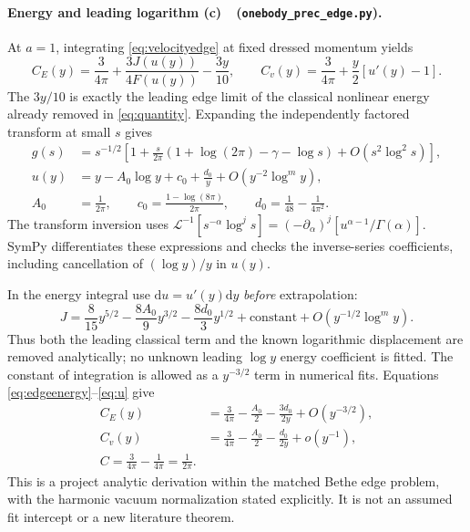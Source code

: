\documentclass[11pt,a4paper]{article}
\newcommand{\Lc}{\textbf{(c)}\ }
\newcommand{\dd}{\mathrm d}
\newcommand{\edge}{\texttt{onebody\_\allowbreak prec\_\allowbreak edge.py}}
\begin{document}
\paragraph{Energy and leading logarithm \Lc\ (\edge).}
At $a=1$, integrating \eqref{eq:velocityedge} at fixed dressed momentum yields
\begin{equation}
 C_E(y)=\frac3{4\pi}+\frac{3J(u(y))}{4F(u(y))}-\frac{3y}{10},\qquad
 C_v(y)=\frac3{4\pi}+\frac y2[u'(y)-1].
 \label{eq:edgeenergy}
\end{equation}
The $3y/10$ is exactly the leading edge limit of the classical nonlinear
energy already removed in \eqref{eq:quantity}.
Expanding the independently factored transform at small $s$ gives
\begin{align}
 g(s)&=s^{-1/2}\left[1+\frac{s}{2\pi}
 (1+\log(2\pi)-\gamma-\log s)+O(s^2\log^2s)\right],\\
 u(y)&=y-A_0\log y+c_0+\frac{d_0}{y}+O(y^{-2}\log^m y),\label{eq:u}\\
 A_0&=\frac1{2\pi},\qquad
 c_0=\frac{1-\log(8\pi)}{2\pi},\qquad
 d_0=\frac1{48}-\frac1{4\pi^2}.
\end{align}
The transform inversion uses
$\mathcal L^{-1}[s^{-\alpha}\log^j s]
=(-\partial_\alpha)^j[u^{\alpha-1}/\Gamma(\alpha)]$.
SymPy differentiates these expressions and checks the inverse-series
coefficients, including cancellation of $(\log y)/y$ in $u(y)$.

In the energy integral use $\dd u=u'(y)\dd y$ \emph{before} extrapolation:
\begin{equation}
 J=\frac8{15}y^{5/2}-\frac{8A_0}{9}y^{3/2}
       -\frac{8d_0}{3}y^{1/2}+\text{constant}+O(y^{-1/2}\log^m y).
\end{equation}
Thus both the leading classical term and the known logarithmic displacement
are removed analytically; no unknown leading $\log y$ energy coefficient is fitted.
The constant of integration is allowed as a $y^{-3/2}$ term in numerical fits.
Equations \eqref{eq:edgeenergy}--\eqref{eq:u} give
\begin{align}
 C_E(y)&=\frac3{4\pi}-\frac{A_0}{2}-\frac{3d_0}{2y}
                  +O(y^{-3/2}),\\
 C_v(y)&=\frac3{4\pi}-\frac{A_0}{2}-\frac{d_0}{2y}+o(y^{-1}),\\
 \boxed{C=\frac3{4\pi}-\frac1{4\pi}=\frac1{2\pi}.} \label{eq:answer}
\end{align}
This is a project analytic derivation within the matched Bethe edge problem,
with the harmonic vacuum normalization stated explicitly. It is not an
assumed fit intercept or a new literature theorem.
\end{document}

